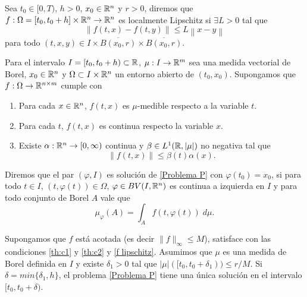 \begin{defi}
    Sea $t_0\in [0,T)$, $h>0$,  $x_0\in \mathbb{R}^n$ y $r>0$, diremos que $f:\Omega=[t_0,t_0+h]\times\mathbb{R}^n\to\mathbb{R}^{n}$ es localmente Lipschitz  si  $\exists L>0$  tal que
	\begin{equation}\label{f lipschitz}
	\left\| f(t,x)-f(t,y)\right\|\leq L\left\| x-y\right\|
\end{equation}
	para todo $(t,x,y)\in I\times \overline{B(x_0,r)}\times \overline{B(x_0,r)}$.
\end{defi}

 
 \begin{defi}
 Para el intervalo $I=[t_0,t_0+h)\subset \mathbb{R}$, $\mu:I\to \mathbb{R}^m$ sea una medida vectorial de Borel, $x_0\in \mathbb{R}^n$  y $\Omega\subset I\times\mathbb{R}^n$ un entorno abierto de $(t_0,x_0)$. Supongamos  que $f:\Omega\to \mathbb{R}^{n\times m}$ cumple con
 	\begin{enumerate}[label=\upshape(\Roman*),ref=(\Roman*)]
 		\item\label{th:c1} Para cada $x\in\mathbb{R}^n$, $f(t,x)$ es $\mu$-medible respecto a la variable $t$. 
 		\item\label{th:c2} Para cada $t$, $f(t,x)$ es continua respecto la variable $x$.
 		\item\label{th:c3} Existe $\alpha:\mathbb{R}^n\to[0,\infty)$ continua y $\beta\in L^1(\mathbb{R},|\mu|)$ no negativa tal que 
 		$$\left\| f(t,x)\right\|\leq \beta(t)\alpha(x) .$$
 	\end{enumerate}
 	 Diremos que el par $(\varphi,I)$ es solución de \ref{Problema P} con $\varphi(t_0)=x_0$, si para todo $t\in I$, $(t,\varphi(t))\in \Omega$,  $\varphi\in BV(I,\mathbb{R}^n)$   es continua a izquierda en $I$ y para todo conjunto de Borel $A$ vale que 
 	$$\mu_{\varphi}(A)=\int_{A}f(t,\varphi(t))\; d\mu.$$ 
 \end{defi}
















\begin{thm} 
	\label{P-L}
	Supongamos que $f$ está acotada (es decir $\|f\|_{\infty}\leq M$), satisface con las condiciones \ref{th:c1} y \ref{th:c2} y \ref{f lipschitz}. Asumimos que $\mu$ es una medida de Borel definida en $I$ y existe $\delta_1>0$ tal que $|\mu|([t_0,t_0+\delta_1))\leq r/M$. Si $\delta=min\{\delta_1, h\}$, el problema \eqref{Problema P} tiene una única solución en el intervalo $[t_0, t_0+\delta)$.
	
\end{thm}
 
